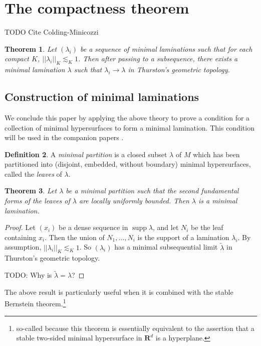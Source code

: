 \documentclass[reqno,10pt]{amsart}
\newcommand{\RR}{\mathbf{R}}
\DeclareMathOperator{\supp}{supp}
\newcommand{\dfn}[1]{\emph{#1}\index{#1}}
\newtheorem{theorem}{Theorem}[section]
\theoremstyle{definition}
\newtheorem{definition}[theorem]{Definition}
\numberwithin{equation}{section}
\begin{document}
\section{The compactness theorem}
TODO Cite Colding-Minicozzi

\begin{theorem}
Let $(\lambda_i)$ be a sequence of minimal laminations such that for each compact $K$, $||\lambda_i||_K \lesssim_K 1$.
Then after passing to a subsequence, there exists a minimal lamination $\lambda$ such that $\lambda_i \to \lambda$ in Thurston's geometric topology.
\end{theorem}


\subsection{Construction of minimal laminations}
We conclude this paper by applying the above theory to prove a condition for a collection of minimal hypersurfaces to form a minimal lamination.
This condition will be used in the companion papers \cite{BackusFLG, DaskalopoulosPrep2}.

\begin{definition}
A \dfn{minimal partition} is a closed subset $\lambda$ of $M$ which has been partitioned into (disjoint, embedded, without boundary) minimal hypersurfaces, called the \dfn{leaves} of $\lambda$. 
\end{definition}

\begin{theorem}
Let $\lambda$ be a minimal partition such that the second fundamental forms of the leaves of $\lambda$ are locally uniformly bounded.
Then $\lambda$ is a minimal lamination.
\end{theorem}
\begin{proof}
Let $(x_i)$ be a dense sequence in $\supp \lambda$, and let $N_i$ be the leaf containing $x_i$.
Then the union of $N_1, \dots, N_i$ is the support of a lamination $\lambda_i$.
By assumption, $||\lambda_i||_K \lesssim_K 1$.
So $(\lambda_i)$ has a minimal subsequential limit $\tilde \lambda$ in Thurston's geometric topology. 

TODO: Why is $\tilde \lambda = \lambda$?
\end{proof}

The above result is particularly useful when it is combined with the stable Bernstein theorem.\footnote{so-called because this theorem is essentially equivalent to the assertion that a stable two-sided minimal hypersurface in $\RR^d$ is a hyperplane.}
\end{document}
